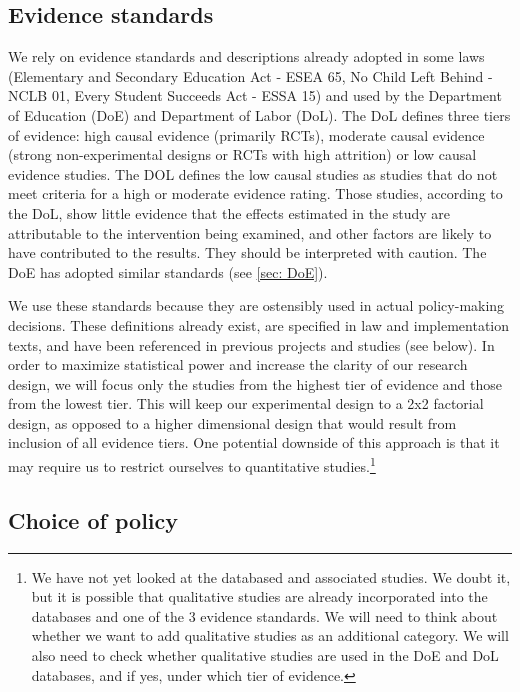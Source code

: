 \documentclass[12pt,final,fleqn]{article}
\theoremstyle{plain}
\begin{document}
\subsection{Evidence standards} \label{sec:Evidence}

We rely on evidence standards and descriptions already adopted in some laws (Elementary and Secondary Education Act - ESEA 65, No Child Left Behind - NCLB 01, Every Student Succeeds Act - ESSA 15) and used by the Department of Education (DoE) and Department of Labor (DoL). The DoL defines three tiers of evidence: high causal evidence (primarily RCTs), moderate causal evidence (strong non-experimental designs or RCTs with high attrition) or low causal evidence studies. The DOL defines the low causal studies as studies that do not meet criteria for a high or moderate evidence rating. Those studies, according to the DoL, show little evidence that the effects estimated in the study are attributable to the intervention being examined, and other factors are likely to have contributed to the results. They should be interpreted with caution. The DoE has adopted similar standards (see \autoref{sec: DoE}). 

We use these standards because they are ostensibly used in actual policy-making decisions. These definitions already exist, are specified in law and implementation texts, and have been referenced in previous projects and studies (see below). In order to maximize statistical power and increase the clarity of our research design, we will focus only the studies from the highest tier of evidence and those from the lowest tier. This will keep our experimental design to a 2x2 factorial design, as opposed to a higher dimensional design that would result from inclusion of all evidence tiers. One potential downside of this approach is that it may require us to restrict ourselves to quantitative studies.\footnote{We have not yet looked at the databased and associated studies. We doubt it, but it is possible that qualitative studies are already incorporated into the databases and one of the 3 evidence standards. We will need to think about whether we want to add qualitative studies as an additional category. We will also need to check whether qualitative studies are used in the DoE and DoL databases, and if yes, under which tier of evidence.} 

\subsection{Choice of policy} \label{sec: Policy}
\end{document}
